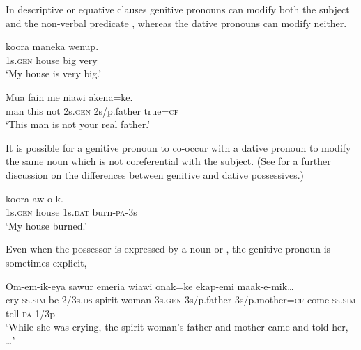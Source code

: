 In descriptive or equative clauses genitive pronouns can modify both the subject   and the non-verbal predicate  , whereas the dative pronouns can modify neither. 

\ea%
\label{ex:3:x568}
\gll {} koora maneka wenup. \\
1s.\textsc{gen} house big very\\
\glt`My house is very big.'
\z

\ea%
\label{ex:3:x569}
\gll Mua fain me  niawi akena=ke. \\
man this not 2s.\textsc{gen} 2s/p.father true=\textsc{cf}\\
\glt`This man is not your real father.'
\z

It is possible for a genitive pronoun to co-occur with a dative pronoun to modify the same noun which is not coreferential with the subject. (See  for a further discussion on the differences between genitive and dative possessives.)

\ea%
\label{ex:3:x570}
\gll {} koora  aw-o-k. \\
1s.\textsc{gen} house 1s.\textsc{dat} burn-\textsc{pa}-3s\\
\glt`My house burned.'
\z

Even when the possessor is expressed by a noun or , the genitive pronoun is sometimes explicit,  \textstyleParagraphContinuationChar{ (} 

\ea%
\label{ex:3:x573}
\gll Om-em-ik-eya sawur emeria  wiawi onak=ke ekap-emi maak-e-mik{\dots}
\\
cry-\textsc{ss}.\textsc{sim}-be-2/3s.\textsc{ds} spirit woman 3s.\textsc{gen} 3s/p.father 3s/p.mother=\textsc{cf} come-\textsc{ss}.\textsc{sim} tell-\textsc{pa}-1/3p\\
\glt`While she was crying, the spirit woman's father and mother came and told her, {\dots}'
\z

